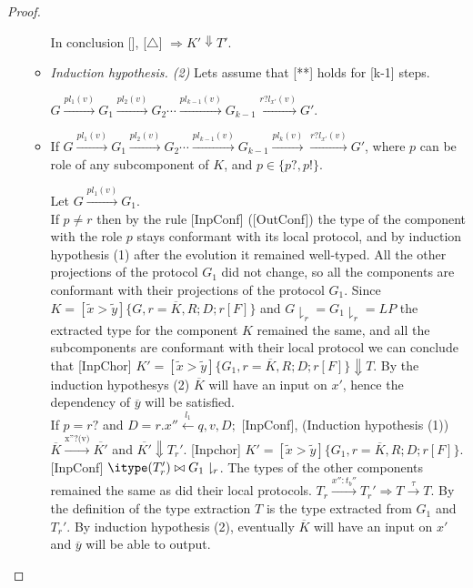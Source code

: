 \begin{proof}
\begin{itemize}
\begin{itemize}
     In conclusion [], [$\triangle$] $\Rightarrow K'\Downarrow T'$.
    
    
    \item
    
  
    
    
    
   \textit{Induction hypothesis. (2)} Lets assume that [**] holds for [k-1] steps.
    
    
    $G\xrightarrow{\text{$pl_1(v)$}}G_1\xrightarrow{\text{$pl_2(v)$}}G_2 \cdots\xrightarrow{\text{$pl_{k-1}(v)$}}G_{k-1} \xrightarrow{\text{$r?l_{x'}(v)$}}G'$.
    
    
    \item If  $G\xrightarrow{\text{$pl_1(v)$}}G_1\xrightarrow{\text{$pl_2(v)$}}G_2 \cdots\xrightarrow{\text{$pl_{k-1}(v)$}}G_{k-1}\xrightarrow{\text{$pl_k(v)$}} \xrightarrow{\text{$r?l_{x'}(v)$}}G'$, where $p$ can be role of any subcomponent of $K$, and $p\in\{p?,p!\}$.
    
    Let $G\xrightarrow{\text{$pl_1(v)$}}G_1$.\\
    
    If $p\neq r$ then by the rule [InpConf] ([OutConf]) the type of the component with the role $p$ stays conformant with its local protocol, and by induction hypothesis (1) after the evolution it remained well-typed. All the other projections of the protocol $G_1$ did not change, so all the components are conformant with their projections of the protocol $G_1$. Since  $K=[\tilde{x}>\tilde{y}]\{G,r=\overline{K},R;D;r[F]\}$ and $G\downharpoonright_r=G_1\downharpoonright_r=LP$ the extracted type for the component $K$ remained the same, and all the subcomponents are conformant with their local protocol we can conclude that [InpChor] $K'=[\tilde{x}>\tilde{y}]\{G_1,r=\overline{K},R;D;r[F]\}\Downarrow T$. By the induction hypothesys (2) $\overline{K}$ will have an input on $x'$, hence the dependency of $\overline{y}$ will be satisfied. 
\\

    
    If $p=r?$ and $D=r.x''\xleftarrow{l_1}q,v,D;$ [InpConf], (Induction hypothesis (1)) $\overline{K}\xrightarrow{\text{x''?(v)}}\overline{K'}$ and $\overline{K'}\Downarrow T_r'$. 
    [Inpchor]  $K'=[\tilde{x}>\tilde{y}]\{G_1,r=\overline{K},R;D;r[F]\}$. [InpConf] $\itype(T_r')\bowtie G_1\downharpoonright_r$. The types of the other components remained the same as did their local protocols. $T_r\xrightarrow{\text{$x'':t_b''$}}T_r'\Rightarrow T\xrightarrow{\text{$\tau$}}T $. By the definition of the  type extraction  $T$
     is the type extracted from $G_1$ and $T_r'$. By induction hypothesis (2), eventually $\overline{K}$ will have an input on $x'$ and $\overline{y}$ will be able to output.
    

\end{itemize}
\end{itemize}
\end{proof}
